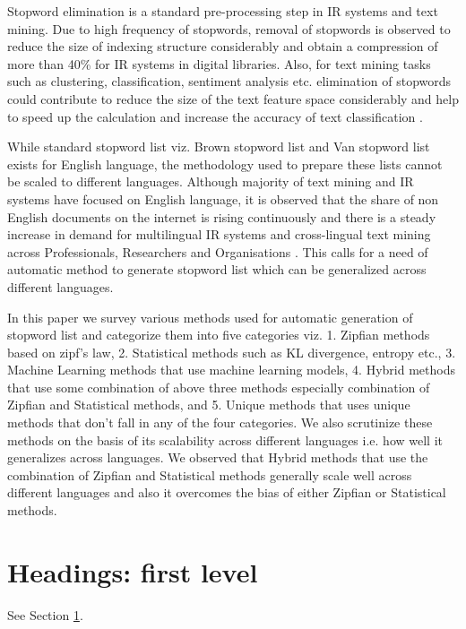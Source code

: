 \documentclass{article}
\begin{document}
Stopword elimination is a standard pre-processing step in IR systems and text mining. Due to high frequency of stopwords, removal of stopwords is observed to reduce the size of indexing structure considerably and obtain a compression of more than 40\% for IR systems in digital libraries\cite{cite6}. Also, for text mining tasks such as clustering, classification, sentiment analysis etc. elimination of stopwords could contribute to reduce the size of the text feature space considerably and help to speed up the calculation and increase the accuracy of text classification \cite{cite7}.

While standard stopword list viz. Brown stopword list \cite{cite9} and Van stopword list \cite{cite10} exists for English language, the methodology used to prepare these lists cannot be scaled to different languages. Although majority of text mining and IR systems have focused on English language, it is observed that the share of non English documents on the internet is rising continuously and there is a steady increase in demand for multilingual IR systems and cross-lingual text mining across Professionals, Researchers and Organisations \cite{cite8}. This calls for a need of automatic method to generate stopword list which can be generalized across different languages.

In this paper we survey various methods used for automatic generation of stopword list and categorize them into five categories viz. 1. Zipfian methods based on zipf's law, 2. Statistical methods such as KL divergence, entropy etc., 3. Machine Learning methods that use machine learning models, 4. Hybrid methods that use some combination of above three methods especially combination of Zipfian and Statistical methods, and 5. Unique methods that uses unique methods that don't fall in any of the four categories. We also scrutinize these methods on the basis of its scalability across different languages i.e. how well it generalizes across languages. We observed that Hybrid methods that use the combination of Zipfian and Statistical methods generally scale well across different languages and also it overcomes the bias of either Zipfian or Statistical methods.



\section{Headings: first level}
\label{sec:headings}

\lipsum[4] See Section \ref{sec:headings}.
\end{document}
